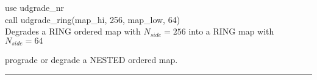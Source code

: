 \begin{example}
{
use udgrade\_nr \\
call udgrade\_ring(map\_hi, 256, map\_low, 64)  \\
}
{
Degrades a RING ordered map with $N_{side}=256$ into a RING map with $N_{side}=64$
}
\end{example}

\begin{related}
  \begin{sulist}{} %
  \item[\htmlref{udgrade\_nest}{sub:udgrade_nest}] prograde or degrade a NESTED
  ordered map.
  \end{sulist}
\end{related}

\rule{\hsize}{2mm}

\newpage
